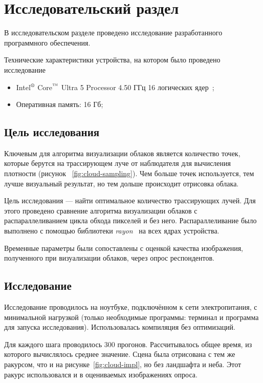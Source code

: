 \chapter{Исследовательский раздел}
В исследовательском разделе проведено исследование разработанного программного обеспечения.

Технические характеристики устройства, на котором было
проведено исследование~\cite{huawei}
\begin{itemize}
	\item Intel$\textsuperscript{\textregistered}$  Core$\textsuperscript{\texttrademark}$ Ultra 5 Processor 4.50 ГГц 16 логических ядер~\cite{intel_technical_specs}; 
	\item Оперативная память: 16 Гб;
\end{itemize}



\section{Цель исследования}

Ключевым для алгоритма визуализации облаков является количество точек, которые берутся на трассирующем луче от наблюдателя для вычисления плотности (рисунок ~\ref{fig:cloud-sampling}). Чем больше точек используется, тем лучше визуальный результат, но тем дольше происходит отрисовка облака.

Цель исследования — найти оптимальное количество трассирующих лучей. Для этого проведено сравнение алгоритма визуализации облаков с распараллеливанием цикла обхода пикселей и без него. Распараллеливание было выполнено с помощью библиотеки \textit{rayon}~\cite{rust_rayon} на всех ядрах устройства.

Временные параметры были сопоставлены с оценкой качества изображения, полученного при визуализации облаков, через опрос респондентов.

\section{Исследование}

Исследование проводилось на ноутбуке, подключённом к сети электропитания, с минимальной нагрузкой (только необходимые программы: терминал и программа для запуска исследования). Использовалась компиляция без оптимизаций.

Для каждого шага проводилось 300 прогонов. Рассчитывалось общее время, из которого вычислялось среднее значение. Сцена была отрисована с тем же ракурсом, что и на рисунке~\ref{fig:cloud-impl}, но без ландшафта и неба. Этот ракурс использовался и в оцениваемых изображениях опроса.

